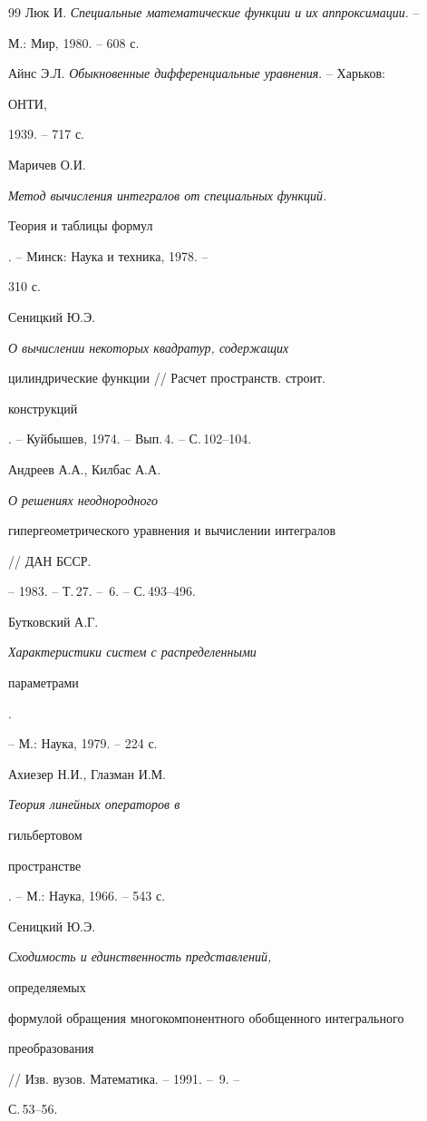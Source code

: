 \begin{thebibliography}{99}
Люк И. {\em Специальные математические функции и их аппроксимации}. -- 


М.: Мир, 1980. -- 608 с. 




Айнс Э.Л. {\em Обыкновенные дифференциальные уравнения}. -- Харьков: 


ОНТИ, 


1939. -- 717 с. 




Маричев О.И. {\em Метод вычисления интегралов от специальных функций.


Теория и таблицы формул}. -- Минск: Наука и техника, 1978. -- 


310 с. 




Сеницкий Ю.Э. {\em О вычислении некоторых квадратур, содержащих 


цилиндрические функции // Расчет пространств. строит.


конструкций}. -- Куйбышев, 1974. -- Вып.\,4. -- С.\,102--104. 




Андреев А.А., Килбас А.А. {\em О решениях неоднородного 


гипергеометрического уравнения и вычислении интегралов} // ДАН БССР. 


-- 1983. -- Т.\,27. -- \No\,6. -- С.\,493--496. 




Бутковский А.Г. {\em Характеристики систем с распределенными 


параметрами}. 


-- М.: Наука, 1979. -- 224 с. 




Ахиезер Н.И., Глазман И.М. {\em Теория линейных операторов в 


гильбертовом 


пространстве}. -- М.: Наука, 1966. -- 543 с. 




Сеницкий Ю.Э. {\em Сходимость и единственность представлений, 


определяемых 


формулой обращения многокомпонентного обобщенного интегрального 


преобразования} // Изв. вузов. Математика. -- 1991. -- \No\,9. -- 


С.\,53--56. 





\end{thebibliography}
